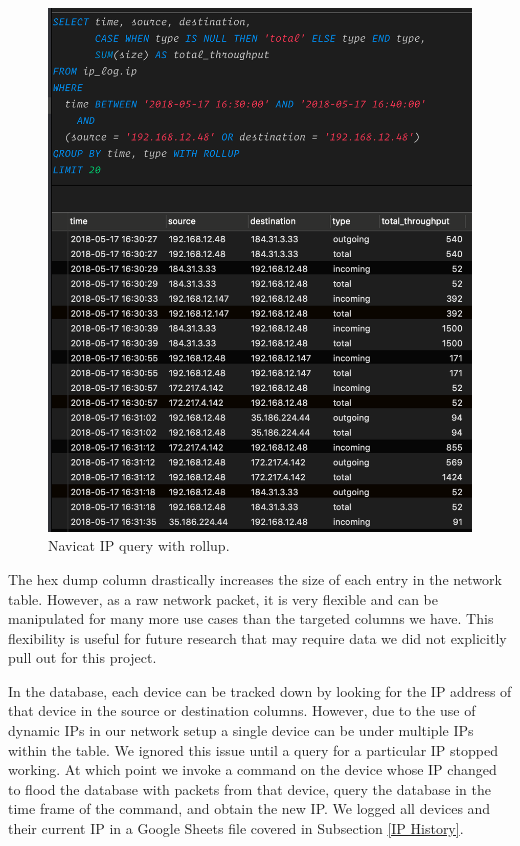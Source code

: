 \begin{figure}[H]
    \centering
    \includegraphics[width=1\textwidth]{figures/navicatRollup.png}
    \caption{Navicat IP query with rollup.}
    \label{fig:navicatRollup}
\end{figure}

The hex dump column drastically increases the size of each entry in the network table. However, as a raw network packet, it is very flexible and can be manipulated for many more use cases than the targeted columns we have. This flexibility is useful for future research that may require data we did not explicitly pull out for this project.

In the database, each device can be tracked down by looking for the IP address of that device in the source or destination columns. However, due to the use of dynamic IPs in our network setup a single device can be under multiple IPs within the table. We ignored this issue until a query for a particular IP stopped working. At which point we invoke a command on the device whose IP changed to flood the database with packets from that device, query the database in the time frame of the command, and obtain the new IP. We logged all devices and their current IP in a Google Sheets \cite{googleSheets} file covered in Subsection \ref{IP History}.

